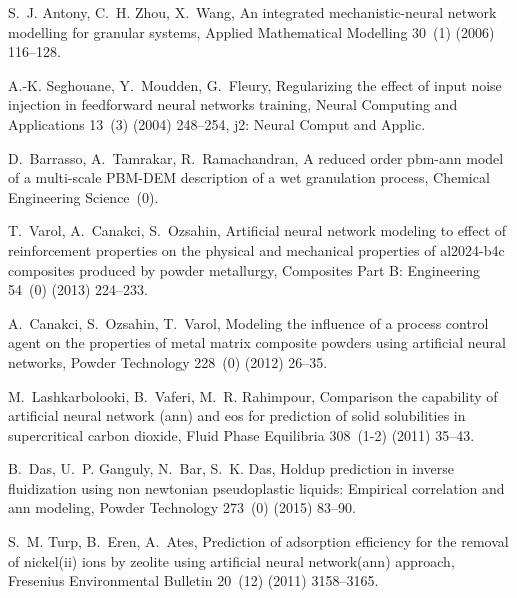 \documentclass{llncs}
\begin{document}
\begin{thebibliography}{10}
S.~J. Antony, C.~H. Zhou, X.~Wang, An integrated mechanistic-neural network
  modelling for granular systems, Applied Mathematical Modelling 30~(1) (2006)
  116--128.

A.-K. Seghouane, Y.~Moudden, G.~Fleury, Regularizing the effect of input noise
  injection in feedforward neural networks training, Neural Computing and
  Applications 13~(3) (2004) 248--254, j2: Neural Comput and Applic.

D.~Barrasso, A.~Tamrakar, R.~Ramachandran, A reduced order pbm-ann model of a
  multi-scale PBM-DEM description of a wet granulation process, Chemical
  Engineering Science~(0).

T.~Varol, A.~Canakci, S.~Ozsahin, Artificial neural network modeling to effect
  of reinforcement properties on the physical and mechanical properties of
  al2024-b4c composites produced by powder metallurgy, Composites Part B:
  Engineering 54~(0) (2013) 224--233.

A.~Canakci, S.~Ozsahin, T.~Varol, Modeling the influence of a process control
  agent on the properties of metal matrix composite powders using artificial
  neural networks, Powder Technology 228~(0) (2012) 26--35.

M.~Lashkarbolooki, B.~Vaferi, M.~R. Rahimpour, Comparison the capability of
  artificial neural network (ann) and eos for prediction of solid solubilities
  in supercritical carbon dioxide, Fluid Phase Equilibria 308~(1-2) (2011)
  35--43.

B.~Das, U.~P. Ganguly, N.~Bar, S.~K. Das, Holdup prediction in inverse
  fluidization using non newtonian pseudoplastic liquids: Empirical correlation
  and ann modeling, Powder Technology 273~(0) (2015) 83--90.

S.~M. Turp, B.~Eren, A.~Ates, Prediction of adsorption efficiency for the
  removal of nickel(ii) ions by zeolite using artificial neural network(ann)
  approach, Fresenius Environmental Bulletin 20~(12) (2011) 3158--3165.


\end{thebibliography}

\end{document}

